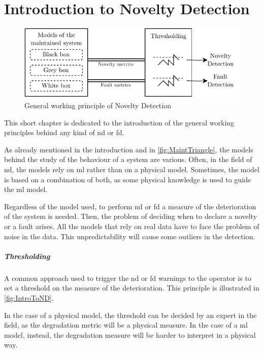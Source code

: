 \chapter{Introduction to Novelty Detection}
\label{ch:GeneralND}

\begin{figure}
    \centering
    \includegraphics[width=\textwidth]{images/Intro/GeneralND.pdf}
    \caption{General working principle of Novelty Detection}
    \label{fig:IntroToND}
\end{figure}

This short chapter is dedicated to the introduction of the general working principles behind any kind of \gls{nd} or \gls{fd}. 

As already mentioned in the introduction and in \autoref{fig:MaintTriangle}, the models behind the study of the behaviour of a system are various. Often, in the field of \gls{nd}, the models rely on \gls{ml} rather than on a physical model. Sometimes, the model is based on a combination of both, as some physical knowledge is used to guide the \gls{ml} model.

Regardless of the model used, to perform \gls{nd} or \gls{fd} a measure of the deterioration of the system is needed. Then, the problem of deciding when to declare a novelty or a fault arises. All the models that rely on real data have to face the problem of noise in the data. This unpredictability will cause some outliers in the detection. 

\paragraph{Thresholding}
\label{sec:Thresholding}

A common approach used to trigger the \gls{nd} or \gls{fd} warnings to the operator is to set a threshold on the measure of the deterioration. This principle is illustrated in \autoref{fig:IntroToND}. 

In the case of a physical model, the threshold can be decided by an expert in the field, as the degradation metric will be a physical measure. In the case of a \gls{ml} model, instead, the degradation measure will be harder to interpret in a physical way. 

